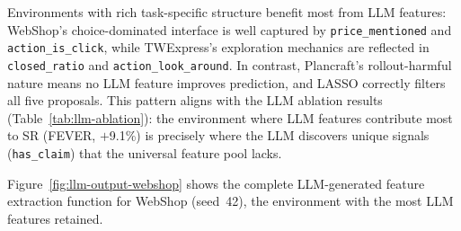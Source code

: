 \begin{table}[h!]
\centering
\caption{LLM-generated features per environment. Each environment
receives 5 LLM-proposed features; LASSO selects those with non-zero
coefficients. Environments with richer task-specific structure
(WebShop, TWExpress) retain more LLM features.}
\label{tab:llm-features}
\end{table}

Environments with rich task-specific structure benefit most from LLM
features: WebShop's choice-dominated interface is well captured by
\texttt{price\_mentioned} and \texttt{action\_is\_click}, while
TWExpress's exploration mechanics are reflected in
\texttt{closed\_ratio} and \texttt{action\_look\_around}. In
contrast, Plancraft's rollout-harmful nature means no LLM feature
improves prediction, and LASSO correctly filters all five proposals.
This pattern aligns with the LLM ablation results
(Table~\ref{tab:llm-ablation}): the environment where LLM features
contribute most to SR (FEVER, $+$9.1\%) is precisely where the
LLM discovers unique signals (\texttt{has\_claim}) that the
universal feature pool lacks.

Figure~\ref{fig:llm-output-webshop} shows the complete LLM-generated feature extraction function for WebShop (seed~42), the environment with the most LLM features retained.

